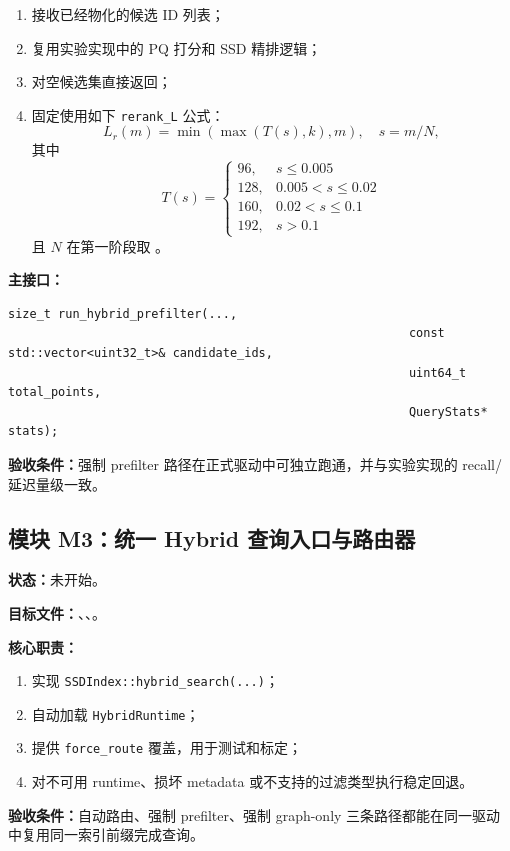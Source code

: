 \documentclass[UTF8]{ctexart}
\begin{document}
\begin{enumerate}
\item 接收已经物化的候选 ID 列表；
\item 复用实验实现中的 PQ 打分和 SSD 精排逻辑；
\item 对空候选集直接返回；
\item 固定使用如下 \texttt{rerank\_L} 公式：
\[
L_r(m)=\min(\max(T(s), k), m), \quad s = m / N,
\]
其中
\[
T(s)=\begin{cases}
96, & s \le 0.005 \\
128, & 0.005 < s \le 0.02 \\
160, & 0.02 < s \le 0.1 \\
192, & s > 0.1
\end{cases}
\]
且 \(N\) 在第一阶段取 。
\end{enumerate}

\textbf{主接口：}

\begin{verbatim}
size_t run_hybrid_prefilter(...,
														const std::vector<uint32_t>& candidate_ids,
														uint64_t total_points,
														QueryStats* stats);
\end{verbatim}

\textbf{验收条件：}强制 prefilter 路径在正式驱动中可独立跑通，并与实验实现的 recall/延迟量级一致。

\subsection{模块 M3：统一 Hybrid 查询入口与路由器}
\textbf{状态：}未开始。

\textbf{目标文件：}、、。

\textbf{核心职责：}

\begin{enumerate}
\item 实现 \texttt{SSDIndex::hybrid\_search(...)}；
\item 自动加载 \texttt{HybridRuntime}；
\item 提供 \texttt{force\_route} 覆盖，用于测试和标定；
\item 对不可用 runtime、损坏 metadata 或不支持的过滤类型执行稳定回退。
\end{enumerate}

\textbf{验收条件：}自动路由、强制 prefilter、强制 graph-only 三条路径都能在同一驱动中复用同一索引前缀完成查询。
\end{document}
